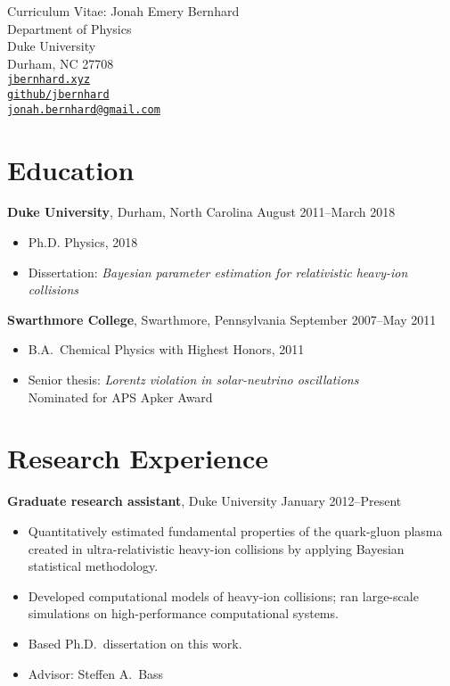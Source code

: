 \documentclass[letterpaper,10pt]{article}
\newcommand{\entry}[3]{\vspace{.5em plus .1em minus .1em}\textbf{#1}, #2 \hfill #3}
\begin{document}
\begin{center}
  \Large
  Curriculum Vitae:  Jonah Emery Bernhard \\[1ex]
  \normalsize\rm
  Department of Physics \\
  Duke University \\
  Durham, NC 27708 \\[1ex]
  \href{http://jbernhard.xyz}{\nolinkurl{jbernhard.xyz}} \\
  \href{https://github.com/jbernhard}{\nolinkurl{github/jbernhard}} \\
  \href{mailto:jonah.bernhard@gmail.com}{\nolinkurl{jonah.bernhard@gmail.com}}
\end{center}


\section{Education}

\entry{Duke University}{Durham, North Carolina}{August 2011--March 2018}

\begin{itemize}
  \item Ph.D. Physics, 2018
  \item Dissertation: \emph{Bayesian parameter estimation for relativistic heavy-ion collisions}
\end{itemize}

\entry{Swarthmore College}{Swarthmore, Pennsylvania}{September 2007--May 2011}

\begin{itemize}
  \item B.A.\ Chemical Physics with Highest Honors, 2011
  \item Senior thesis: \emph{Lorentz violation in solar-neutrino oscillations} \\
    Nominated for APS Apker Award
\end{itemize}


\section{Research Experience}

\entry{Graduate research assistant}{Duke University}{January 2012--Present}

\begin{itemize}
  \item Quantitatively estimated fundamental properties of the quark-gluon plasma created in ultra-relativistic heavy-ion collisions by applying Bayesian statistical methodology.
  \item Developed computational models of heavy-ion collisions;
    ran large-scale simulations on high-performance computational systems.
  \item Based Ph.D.\ dissertation on this work.
  \item Advisor: Steffen A.\ Bass
\end{itemize}
\end{document}
